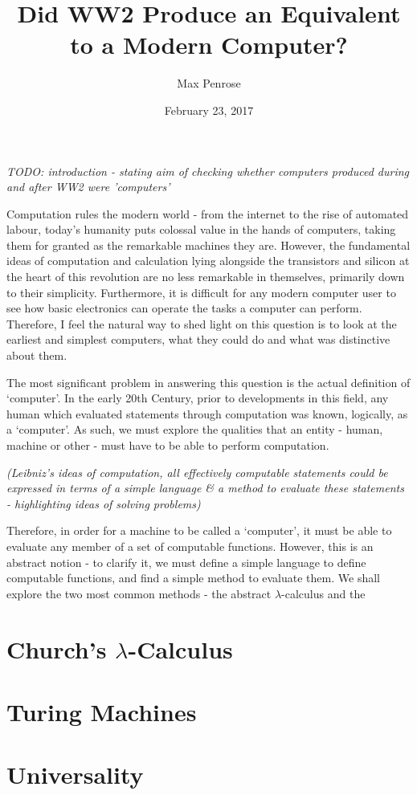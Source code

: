 \documentclass {article}
\title{Did WW2 Produce an Equivalent to a Modern Computer?}
\date{February 23, 2017}
\author{Max Penrose}
\begin{document}
\maketitle
\tableofcontents
\clearpage
\textit{TODO: introduction - stating aim of checking whether computers produced during and after WW2 were 'computers'}

Computation rules the modern world - from the internet to the rise of automated labour, today's humanity puts colossal value in the hands of computers, taking them for granted as the remarkable machines they are. However, the fundamental ideas of computation and calculation lying alongside the transistors and silicon at the heart of this revolution are no less remarkable in themselves, primarily down to their simplicity. Furthermore, it is difficult for any modern computer user to see how basic electronics can operate the tasks a computer can perform. Therefore, I feel the natural way to shed light on this question is to look at the earliest and simplest computers, what they could do and what was distinctive about them.

The most significant problem in answering this question is the actual definition of `computer'. In the early 20th Century, prior to developments in this field, any human which evaluated statements through computation was known, logically, as a `computer'. As such, we must explore the qualities that an entity - human, machine or other - must have to be able to perform computation.

\textit{(Leibniz's ideas of computation, all effectively computable statements could be expressed in terms of a simple language \& a method to evaluate these statements - highlighting ideas of solving problems)}

Therefore, in order for a machine to be called a `computer', it must be able to evaluate any member of a set of computable functions. However, this is an abstract notion - to clarify it, we must define a simple language to define computable functions, and find a simple method to evaluate them. We shall explore the two most common methods - the abstract $\lambda$-calculus and the  



\section{Church's $\lambda$-Calculus}



\section{Turing Machines}



\section{Universality}




\end{document}
